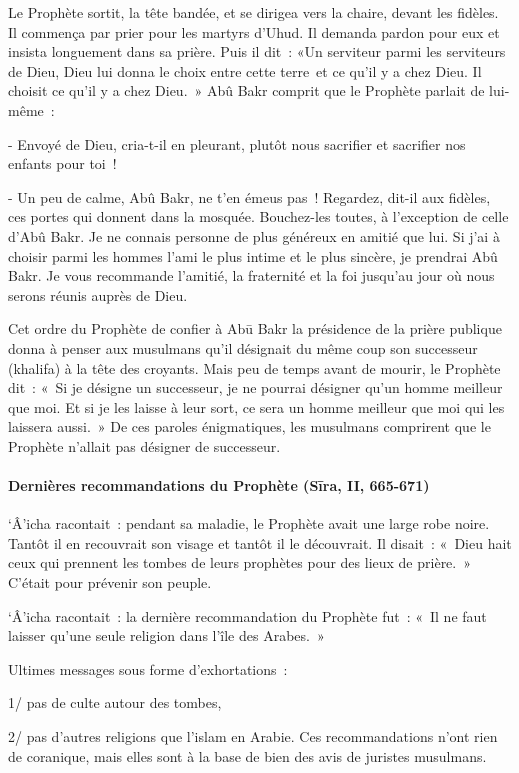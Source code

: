 {Le Prophète sortit, la tête bandée, et se dirigea vers la chaire,
devant les fidèles. Il commença par prier pour les martyrs d'Uhud. Il
demanda pardon pour eux et insista longuement dans sa prière. Puis il
dit~: «Un serviteur parmi les serviteurs de Dieu, Dieu lui donna le
choix entre cette terre~et ce qu'il y a chez Dieu. Il choisit ce qu'il y
a chez Dieu.~» Abû Bakr comprit que le Prophète parlait de lui-même~:}

{- Envoyé de Dieu, cria-t-il en pleurant, plutôt nous sacrifier et
sacrifier nos enfants pour toi~!}

{- Un peu de calme, Abû Bakr, ne t'en émeus pas~! Regardez, dit-il
aux fidèles, ces portes qui donnent dans la mosquée. Bouchez-les toutes,
à l'exception de celle d'Abû Bakr. Je ne connais personne de plus
généreux en amitié que lui. Si j'ai à choisir parmi les hommes l'ami le
plus intime et le plus sincère, je prendrai Abû Bakr. Je vous recommande
l'amitié, la fraternité et la foi jusqu'au jour où nous serons réunis
auprès de Dieu.}

{Cet ordre du Prophète de confier à Abū Bakr la présidence de la
prière publique donna à penser aux musulmans qu'il désignait du même
coup son successeur (khalifa) à la tête des croyants. Mais peu de temps
avant de mourir, le Prophète dit~: «~Si je désigne un successeur, je ne
pourrai désigner qu'un homme meilleur que moi. Et si je les laisse à
leur sort, ce sera un homme meilleur que moi qui les laissera aussi.~»
De ces paroles énigmatiques, les musulmans comprirent que le Prophète
n'allait pas désigner de successeur.}

\paragraph{Dernières recommandations du Prophète (Sīra, II, 665-671)}

{`Â'icha racontait~: pendant sa maladie, le Prophète avait une
large robe noire. Tantôt il en recouvrait son visage et tantôt il le
découvrait. Il disait~: «~Dieu hait ceux qui prennent les tombes de
leurs prophètes pour des lieux de prière.~» C'était pour prévenir son
peuple.}

{`Â'icha racontait~: la dernière recommandation du Prophète fut~:
«~Il ne faut laisser qu'une seule religion dans l'île des Arabes.~»}

Ultimes messages sous forme d'exhortations~:

1/ pas de culte autour des tombes,

2/ pas d'autres religions que l'islam en Arabie. Ces recommandations
n'ont rien de coranique, mais elles sont à la base de bien des avis de
juristes musulmans.


